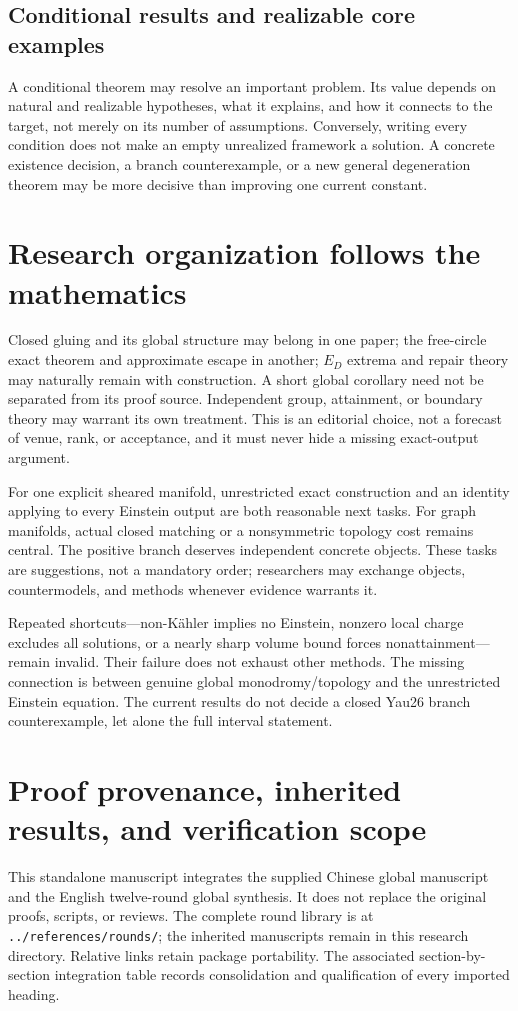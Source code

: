 \documentclass[11pt]{article}
\theoremstyle{definition}\newtheorem{problem}[theorem]{Open problem}
\theoremstyle{remark}\newtheorem{remark}[theorem]{Scope}
\numberwithin{equation}{section}
\begin{document}
\subsection{Conditional results and realizable core examples}\label{sec:conditional-value}
A conditional theorem may resolve an important problem. Its value depends on natural and realizable hypotheses, what it explains, and how it connects to the target, not merely on its number of assumptions. Conversely, writing every condition does not make an empty unrealized framework a solution. A concrete existence decision, a branch counterexample, or a new general degeneration theorem may be more decisive than improving one current constant.

\section{Research organization follows the mathematics}\label{sec:organization}
Closed gluing and its global structure may belong in one paper; the free-circle exact theorem and approximate escape in another; $E_D$ extrema and repair theory may naturally remain with construction. A short global corollary need not be separated from its proof source. Independent group, attainment, or boundary theory may warrant its own treatment. This is an editorial choice, not a forecast of venue, rank, or acceptance, and it must never hide a missing exact-output argument.

For one explicit sheared manifold, unrestricted exact construction and an identity applying to every Einstein output are both reasonable next tasks. For graph manifolds, actual closed matching or a nonsymmetric topology cost remains central. The positive branch deserves independent concrete objects. These tasks are suggestions, not a mandatory order; researchers may exchange objects, countermodels, and methods whenever evidence warrants it.

Repeated shortcuts---non-K\"ahler implies no Einstein, nonzero local charge excludes all solutions, or a nearly sharp volume bound forces nonattainment---remain invalid. Their failure does not exhaust other methods. The missing connection is between genuine global monodromy/topology and the unrestricted Einstein equation. The current results do not decide a closed Yau26 branch counterexample, let alone the full interval statement.

\appendix
\section{Proof provenance, inherited results, and verification scope}\label{app:sources}
This standalone manuscript integrates the supplied Chinese global manuscript and the English twelve-round global synthesis. It does not replace the original proofs, scripts, or reviews. The complete round library is at \nolinkurl{../references/rounds/}; the inherited manuscripts remain in this research directory. Relative links retain package portability. The associated section-by-section integration table records consolidation and qualification of every imported heading.
\end{document}
